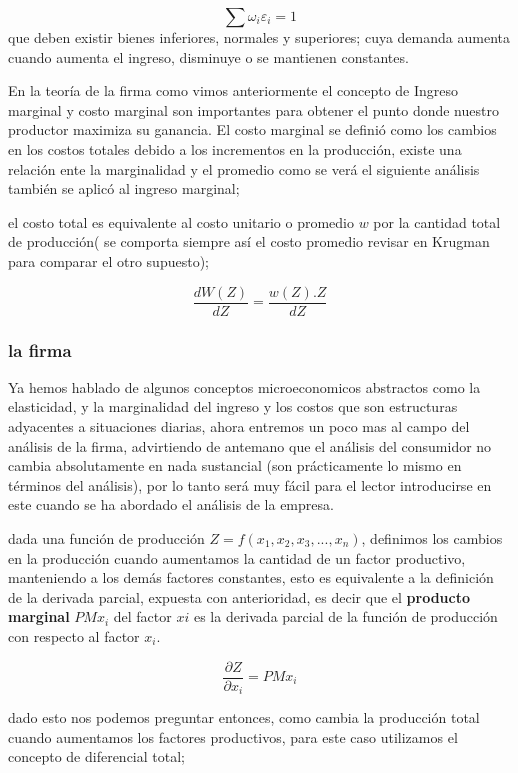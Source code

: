 \documentclass[12pt]{article}
\begin{document}
$$ \sum \omega_{i} \varepsilon_{i}=1 $$  que deben existir bienes inferiores,  normales y superiores; cuya demanda aumenta cuando aumenta el ingreso, disminuye o se mantienen constantes.


En la teoría de la firma como vimos anteriormente el concepto de Ingreso marginal y costo marginal son importantes para obtener el punto donde nuestro productor maximiza su ganancia.  El costo marginal se definió como los cambios en los costos totales debido a los incrementos en la producción, existe una relación ente la marginalidad y el promedio como se verá el siguiente análisis también se aplicó al ingreso marginal;

el costo total es equivalente al costo unitario o promedio $w$ por la cantidad total de producción( se comporta siempre así el costo promedio revisar en Krugman para comparar el otro supuesto); 

$$\dfrac{dW(Z)}{dZ}= \dfrac{w(Z).Z}{dZ}$$


\subsubsection{la firma}



Ya hemos hablado de algunos conceptos microeconomicos abstractos como la elasticidad, y la marginalidad del ingreso y los costos que son estructuras adyacentes a situaciones diarias, ahora entremos un poco mas al campo del análisis de la firma, advirtiendo  de antemano que el análisis del consumidor no cambia absolutamente en nada sustancial (son prácticamente lo mismo en términos del análisis), por lo tanto será muy fácil para el lector introducirse en este cuando se ha abordado el análisis de la empresa.

dada una función de producción 
$Z=f(x_1,x_2,x_3,...,x_n)$, definimos los cambios en la producción cuando aumentamos la cantidad de un factor productivo, manteniendo a los demás factores constantes, esto es equivalente a la definición de la derivada parcial, expuesta con anterioridad, es decir que el \textbf{producto marginal} $PMx_{i}$ del factor $xi$ es la derivada parcial de la función de producción con respecto al factor $x_{i}$.

$$\frac{\partial Z}{\partial x_{i}}= PMx_{i}$$

dado esto nos podemos preguntar entonces, como cambia la producción total cuando aumentamos los factores productivos, para este caso utilizamos el concepto de diferencial total; 
\end{document}
